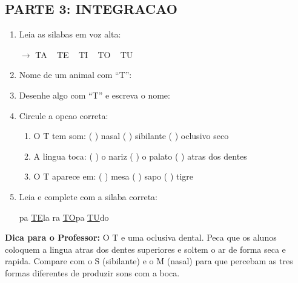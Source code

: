 \begin{exercicio}
\subsection*{PARTE 3: INTEGRACAO}

\begin{enumerate}[resume]
  \item Leia as silabas em voz alta:
  \begin{center}
  $\rightarrow$ TA  ~  TE  ~  TI  ~  TO  ~  TU
  \end{center}

  \item Nome de um animal com ``T'':
  \begin{center}
  \underline{\hspace{6cm}}
  \end{center}

  \item Desenhe algo com ``T'' e escreva o nome:
  \begin{center}
  \end{center}

  \item Circule a opcao correta:
  \begin{enumerate}[label=(\alph*)]
    \item O T tem som: ( ) nasal ( ) sibilante ( ) oclusivo seco
    \item A lingua toca: ( ) o nariz ( ) o palato ( ) atras dos dentes
    \item O T aparece em: ( ) mesa ( ) sapo ( ) tigre
  \end{enumerate}

  \item Leia e complete com a silaba correta:
  \begin{center}
  pa \quad \underline{TE}la \quad {}ra \quad \underline{TO}pa \quad \underline{TU}do
  \end{center}
\end{enumerate}
\end{exercicio}

\begin{dica}
\textbf{Dica para o Professor:} O T e uma oclusiva dental. Peca que os alunos coloquem a lingua atras dos dentes superiores e soltem o ar de forma seca e rapida. Compare com o S (sibilante) e o M (nasal) para que percebam as tres formas diferentes de produzir sons com a boca.
\end{dica}

